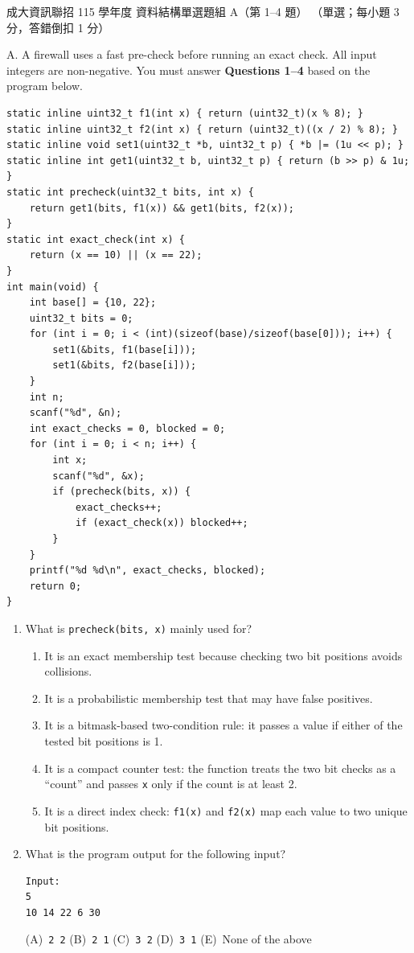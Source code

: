 \begin{pastexam}[label={px:ncku-115-prog-04}]{成大資訊聯招 115 學年度 資料結構單選題組 A（第 1--4 題）}
（單選；每小題 3 分，答錯倒扣 1 分）

A. A firewall uses a fast pre-check before running an exact check. All input integers are non-negative.
You must answer \textbf{Questions 1--4} based on the program below.
\begin{verbatim}
static inline uint32_t f1(int x) { return (uint32_t)(x % 8); }
static inline uint32_t f2(int x) { return (uint32_t)((x / 2) % 8); }
static inline void set1(uint32_t *b, uint32_t p) { *b |= (1u << p); }
static inline int get1(uint32_t b, uint32_t p) { return (b >> p) & 1u; }
static int precheck(uint32_t bits, int x) {
    return get1(bits, f1(x)) && get1(bits, f2(x));
}
static int exact_check(int x) {
    return (x == 10) || (x == 22);
}
int main(void) {
    int base[] = {10, 22};
    uint32_t bits = 0;
    for (int i = 0; i < (int)(sizeof(base)/sizeof(base[0])); i++) {
        set1(&bits, f1(base[i]));
        set1(&bits, f2(base[i]));
    }
    int n;
    scanf("%d", &n);
    int exact_checks = 0, blocked = 0;
    for (int i = 0; i < n; i++) {
        int x;
        scanf("%d", &x);
        if (precheck(bits, x)) {
            exact_checks++;
            if (exact_check(x)) blocked++;
        }
    }
    printf("%d %d\n", exact_checks, blocked);
    return 0;
}
\end{verbatim}
\begin{enumerate}
\item[1.] [3\%] What is \texttt{precheck(bits, x)} mainly used for?
\begin{enumerate}[label=(\Alph*),nosep]
\item It is an exact membership test because checking two bit positions avoids collisions.
\item It is a probabilistic membership test that may have false positives.
\item It is a bitmask-based two-condition rule: it passes a value if either of the tested bit positions is 1.
\item It is a compact counter test: the function treats the two bit checks as a ``count'' and passes
\texttt{x} only if the count is at least 2.
\item It is a direct index check: \texttt{f1(x)} and \texttt{f2(x)} map each value to two unique bit positions.
\end{enumerate}

\item[2.] [3\%] What is the program output for the following input?
\begin{verbatim}
Input:
5
10 14 22 6 30
\end{verbatim}
(A)~\texttt{2 2} \qquad (B)~\texttt{2 1} \qquad (C)~\texttt{3 2} \qquad (D)~\texttt{3 1}
\qquad (E)~None of the above


\end{enumerate}
\end{pastexam}
